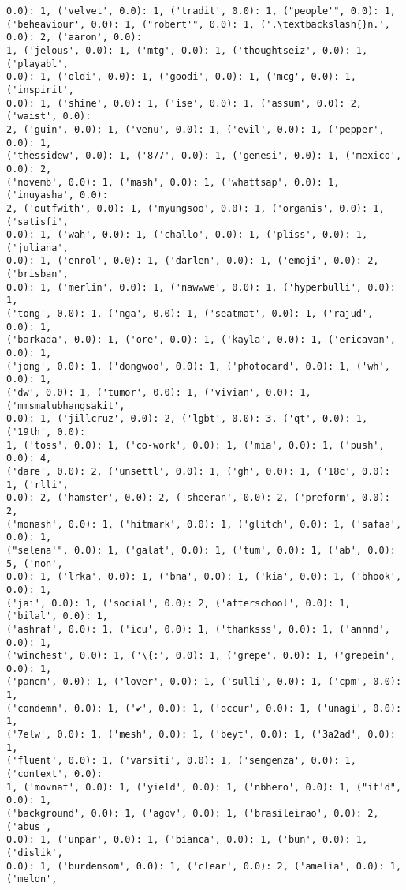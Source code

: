 \documentclass[11pt]{article}
\begin{document}
\begin{Verbatim}[commandchars=\\\{\}]
0.0): 1, ('velvet', 0.0): 1, ('tradit', 0.0): 1, ("people'", 0.0): 1,
('beheaviour', 0.0): 1, ("robert'", 0.0): 1, ('.\textbackslash{}n.', 0.0): 2, ('aaron', 0.0):
1, ('jelous', 0.0): 1, ('mtg', 0.0): 1, ('thoughtseiz', 0.0): 1, ('playabl',
0.0): 1, ('oldi', 0.0): 1, ('goodi', 0.0): 1, ('mcg', 0.0): 1, ('inspirit',
0.0): 1, ('shine', 0.0): 1, ('ise', 0.0): 1, ('assum', 0.0): 2, ('waist', 0.0):
2, ('guin', 0.0): 1, ('venu', 0.0): 1, ('evil', 0.0): 1, ('pepper', 0.0): 1,
('thessidew', 0.0): 1, ('877', 0.0): 1, ('genesi', 0.0): 1, ('mexico', 0.0): 2,
('novemb', 0.0): 1, ('mash', 0.0): 1, ('whattsap', 0.0): 1, ('inuyasha', 0.0):
2, ('outfwith', 0.0): 1, ('myungsoo', 0.0): 1, ('organis', 0.0): 1, ('satisfi',
0.0): 1, ('wah', 0.0): 1, ('challo', 0.0): 1, ('pliss', 0.0): 1, ('juliana',
0.0): 1, ('enrol', 0.0): 1, ('darlen', 0.0): 1, ('emoji', 0.0): 2, ('brisban',
0.0): 1, ('merlin', 0.0): 1, ('nawwwe', 0.0): 1, ('hyperbulli', 0.0): 1,
('tong', 0.0): 1, ('nga', 0.0): 1, ('seatmat', 0.0): 1, ('rajud', 0.0): 1,
('barkada', 0.0): 1, ('ore', 0.0): 1, ('kayla', 0.0): 1, ('ericavan', 0.0): 1,
('jong', 0.0): 1, ('dongwoo', 0.0): 1, ('photocard', 0.0): 1, ('wh', 0.0): 1,
('dw', 0.0): 1, ('tumor', 0.0): 1, ('vivian', 0.0): 1, ('mmsmalubhangsakit',
0.0): 1, ('jillcruz', 0.0): 2, ('lgbt', 0.0): 3, ('qt', 0.0): 1, ('19th', 0.0):
1, ('toss', 0.0): 1, ('co-work', 0.0): 1, ('mia', 0.0): 1, ('push', 0.0): 4,
('dare', 0.0): 2, ('unsettl', 0.0): 1, ('gh', 0.0): 1, ('18c', 0.0): 1, ('rlli',
0.0): 2, ('hamster', 0.0): 2, ('sheeran', 0.0): 2, ('preform', 0.0): 2,
('monash', 0.0): 1, ('hitmark', 0.0): 1, ('glitch', 0.0): 1, ('safaa', 0.0): 1,
("selena'", 0.0): 1, ('galat', 0.0): 1, ('tum', 0.0): 1, ('ab', 0.0): 5, ('non',
0.0): 1, ('lrka', 0.0): 1, ('bna', 0.0): 1, ('kia', 0.0): 1, ('bhook', 0.0): 1,
('jai', 0.0): 1, ('social', 0.0): 2, ('afterschool', 0.0): 1, ('bilal', 0.0): 1,
('ashraf', 0.0): 1, ('icu', 0.0): 1, ('thanksss', 0.0): 1, ('annnd', 0.0): 1,
('winchest', 0.0): 1, ('\{:', 0.0): 1, ('grepe', 0.0): 1, ('grepein', 0.0): 1,
('panem', 0.0): 1, ('lover', 0.0): 1, ('sulli', 0.0): 1, ('cpm', 0.0): 1,
('condemn', 0.0): 1, ('✔', 0.0): 1, ('occur', 0.0): 1, ('unagi', 0.0): 1,
('7elw', 0.0): 1, ('mesh', 0.0): 1, ('beyt', 0.0): 1, ('3a2ad', 0.0): 1,
('fluent', 0.0): 1, ('varsiti', 0.0): 1, ('sengenza', 0.0): 1, ('context', 0.0):
1, ('movnat', 0.0): 1, ('yield', 0.0): 1, ('nbhero', 0.0): 1, ("it'd", 0.0): 1,
('background', 0.0): 1, ('agov', 0.0): 1, ('brasileirao', 0.0): 2, ('abus',
0.0): 1, ('unpar', 0.0): 1, ('bianca', 0.0): 1, ('bun', 0.0): 1, ('dislik',
0.0): 1, ('burdensom', 0.0): 1, ('clear', 0.0): 2, ('amelia', 0.0): 1, ('melon',

\end{Verbatim}
\end{document}
